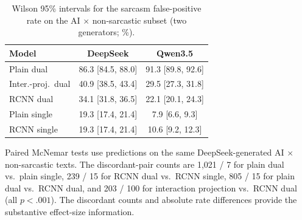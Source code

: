 \begin{table}[h]
  \centering
  \small
  \setlength{\tabcolsep}{3pt}
  \begin{tabular}{@{}lcc@{}}
    \toprule
    \textbf{Model} & \textbf{DeepSeek} & \textbf{Qwen3.5} \\
    \midrule
    Plain dual & 86.3 [84.5, 88.0] & 91.3 [89.8, 92.6] \\
    Inter.-proj.\ dual & 40.9 [38.5, 43.4] & 29.5 [27.3, 31.8] \\
    RCNN dual & 34.1 [31.8, 36.5] & 22.1 [20.1, 24.3] \\
    Plain single & 19.3 [17.4, 21.4] & 7.9 [6.6, 9.3] \\
    RCNN single & 19.3 [17.4, 21.4] & 10.6 [9.2, 12.3] \\
    \bottomrule
  \end{tabular}
  \caption{Wilson 95\% intervals for the sarcasm false-positive rate on the AI $\times$ non-sarcastic subset (two generators; \%).}
  \label{tab:wilson}
\end{table}

Paired McNemar tests use predictions on the same DeepSeek-generated AI $\times$ non-sarcastic texts. The discordant-pair counts are 1{,}021 / 7 for plain dual vs.\ plain single, 239 / 15 for RCNN dual vs.\ RCNN single, 805 / 15 for plain dual vs.\ RCNN dual, and 203 / 100 for interaction projection vs.\ RCNN dual (all $p < .001$). The discordant counts and absolute rate differences provide the substantive effect-size information.

\begin{table}[h]
  \centering
  \small
  \caption{Language-stratified sarcasm false-positive rates on AI texts prompted to be non-sarcastic (\%; Wilson 95\% intervals). Exact paired McNemar tests give $p<.001$ for both plain comparisons and RCNN English, and $p=2.4\times10^{-5}$ for RCNN Chinese.}
  \label{tab:lang-quadrant}
\end{table}

